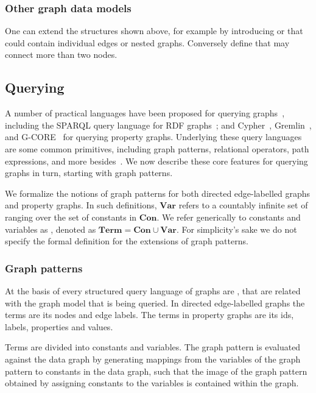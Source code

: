 \subsubsection{Other graph data models}
One can extend the structures shown above, for example by introducing   or  that could contain individual edges or nested graphs. Conversely  define  that may connect more than two nodes.

\subsection{Querying}\label{querying}
A number of practical languages have been proposed for querying graphs~\cite{Angles2017FoundationmodernQueryLnguagesforGraphDatabases}, including the SPARQL query language for RDF graphs~\cite{Harris2013SPARQL}; and Cypher~\cite{Francis2018Cypher}, Gremlin~\cite{Rodriguez2015Gremlin}, and G-CORE~\cite{Angles2018G-CORE} for querying property graphs. Underlying these query languages are some common primitives, including graph patterns, relational operators, path expressions, and more besides~\cite{Angles2017FoundationmodernQueryLnguagesforGraphDatabases}. We now describe these core features for querying graphs in turn, starting with graph patterns. 

\medskip
We formalize the notions of graph patterns for both directed edge-labelled graphs and property graphs. In such definitions, $\textbf{Var}$ refers to a countably infinite set of  ranging over the set of constants in $\textbf{Con}$. We refer generically to constants and variables as , denoted as $\textbf{Term} = \textbf{Con} \cup \textbf{Var}$. For simplicity's sake we do not specify the formal definition for the extensions of graph patterns.

\subsubsection{Graph patterns}
At the basis of every structured query language of graphs are , that are related with the graph model that is being queried. In directed edge-labelled graphs the terms are its nodes and edge labels. The terms in property graphs are its ids, labels, properties and values.

Terms are divided into constants and variables. The graph pattern is evaluated against the data graph by generating mappings from the variables of the graph pattern to constants in the data graph, such that the image of the graph pattern obtained by assigning constants to the variables is contained within the graph. 

